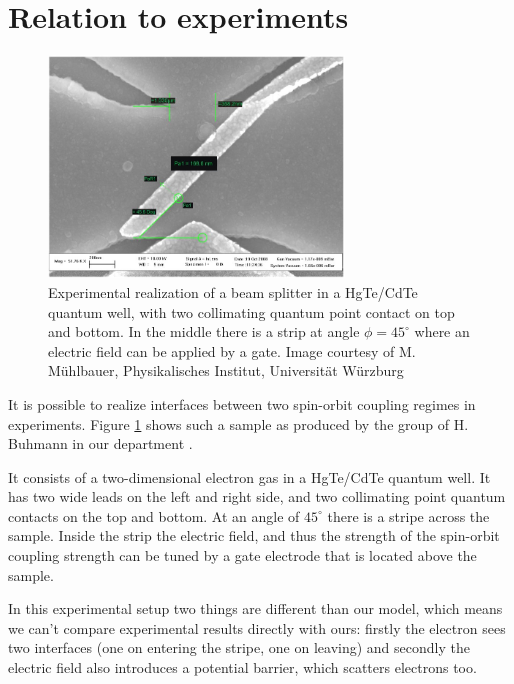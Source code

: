 \section{Relation to experiments}

\begin{figure}[htb]
    \begin{center}
        \includegraphics[width=0.7\textwidth]{beamsplitter2.jpg}
    \end{center}
    \caption{Experimental realization of a beam splitter in a HgTe/CdTe quantum
        well, with two
        collimating quantum point contact on top and bottom. In the middle
        there is a strip at angle $\phi = 45^\circ$ where an electric field
        can be applied by a gate. Image courtesy of M. Mühlbauer,
        Physikalisches Institut, Universität Würzburg\cite{mathias}}
    \label{fig:experiment}
\end{figure}

It is possible to realize interfaces between two spin-orbit coupling regimes
in experiments. Figure \ref{fig:experiment} shows such a sample as produced
by the group of H. Buhmann in our department \cite{mathias}.

It consists of a two-dimensional electron gas in a HgTe/CdTe quantum well. It has
two wide leads on the left and right side, and two collimating point quantum
contacts on the top and bottom. At an angle of $45^{\circ}$ there is a stripe
across the sample. Inside the strip the electric field, and thus the strength
of the spin-orbit coupling strength can be tuned by a gate electrode that is
located above the sample.

In this experimental setup two things are different than our model, which
means we can't compare experimental results directly with ours: firstly the
electron sees two interfaces (one on entering the stripe, one on leaving) and
secondly the electric field also introduces a potential barrier, which
scatters electrons too.


